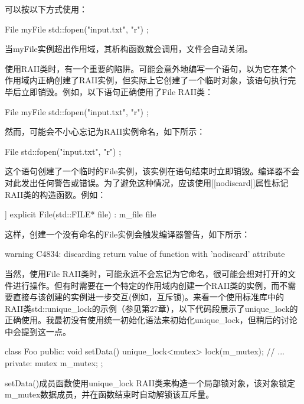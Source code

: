 可以按以下方式使用：

\begin{cpp}
File myFile { std::fopen("input.txt", "r") };
\end{cpp}

当myFile实例超出作用域，其析构函数就会调用，文件会自动关闭。

使用RAII类时，有一个重要的陷阱。可能会意外地编写一个语句，以为它在某个作用域内正确创建了RAII实例，但实际上它创建了一个临时对象，该语句执行完毕后立即销毁。例如，以下语句正确使用了File RAII类：

\begin{cpp}
File myFile { std::fopen("input.txt", "r") };
\end{cpp}

然而，可能会不小心忘记为RAII实例命名，如下所示：

\begin{cpp}
File { std::fopen("input.txt", "r") };
\end{cpp}

这个语句创建了一个临时的File实例，该实例在语句结束时立即销毁。编译器不会对此发出任何警告或错误。为了避免这种情况，应该使用[[nodiscard]]属性标记RAII类的构造函数。例如：

\begin{cpp}
[[nodiscard]] explicit File(std::FILE* file) : m_file{ file } { }
\end{cpp}

这样，创建一个没有命名的File实例会触发编译器警告，如下所示：

\begin{shell}
warning C4834: discarding return value of function with 'nodiscard' attribute
\end{shell}

当然，使用File RAII类时，可能永远不会忘记为它命名，很可能会想对打开的文件进行操作。但有时需要在一个特定的作用域内创建一个RAII类的实例，而不需要直接与该创建的实例进一步交互(例如，互斥锁)。来看一个使用标准库中的RAII类std::unique\_lock的示例（参见第27章），以下代码段展示了unique\_lock的正确使用。我最初没有使用统一初始化语法来初始化unique\_lock，但稍后的讨论中会提到这一点。

\begin{cpp}
class Foo
{
    public:
        void setData()
        {
            unique_lock<mutex> lock(m_mutex);
            // ...
        }
    private:
        mutex m_mutex;
};
\end{cpp}

setData()成员函数使用unique\_lock RAII类来构造一个局部锁对象，该对象锁定m\_mutex数据成员，并在函数结束时自动解锁该互斥量。

